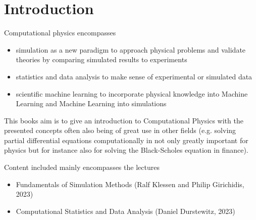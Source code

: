 \section{Introduction}
\thispagestyle{plain}


Computational physics encompasses

\begin{itemize}
    \item simulation as a new paradigm to approach physical problems
    and validate theories by comparing simulated results to experiments
    \item statistics and data analysis to make sense of experimental or simulated data
    \item scientific machine learning to incorporate physical knowledge into Machine Learning and Machine Learning into simulations
\end{itemize}

This books aim is to give an introduction to Computational Physics with the presented concepts often also being
of great use in other fields (e.g. solving partial differential equations computationally in not only
greatly important for physics but for instance also for solving the Black-Scholes equation in finance).

Content included mainly encompasses the lectures

\begin{itemize}
    \item Fundamentals of Simulation Methods (Ralf Klessen and Philip Girichidis, 2023)
    \item Computational Statistics and Data Analysis (Daniel Durstewitz, 2023)
\end{itemize}

\pagebreak